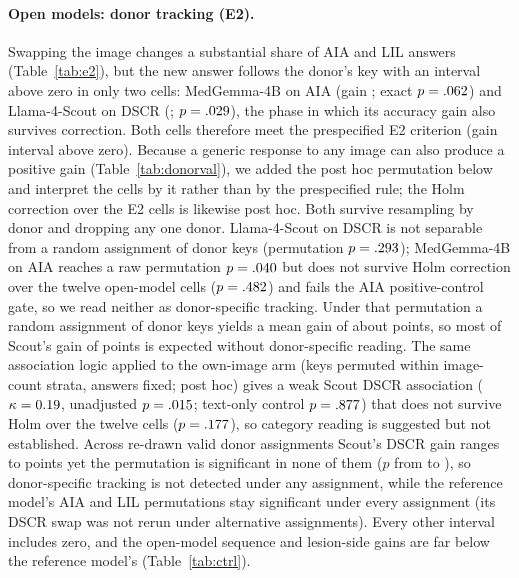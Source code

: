 \documentclass[conference]{IEEEtran}
\begin{document}
\paragraph{Open models: donor tracking (E2).} Swapping the image changes a substantial share of AIA and LIL answers (Table~\ref{tab:e2}), but the new answer follows the donor's key with an interval above zero in only two cells: MedGemma-4B on AIA (gain \vfourEtwoGainAIAMedGemma{}; exact $p=.062{}$) and Llama-4-Scout on DSCR (\vfourEtwoGainDSCRScout{}; $p=.029{}$), the phase in which its accuracy gain also survives correction. Both cells therefore meet the prespecified E2 criterion (gain interval above zero). Because a generic response to any image can also produce a positive gain (Table~\ref{tab:donorval}), we added the post hoc permutation below and interpret the cells by it rather than by the prespecified rule; the Holm correction over the E2 cells is likewise post hoc. Both survive resampling by donor and dropping any one donor. Llama-4-Scout on DSCR is not separable from a random assignment of donor keys (permutation $p=.293{}$); MedGemma-4B on AIA reaches a raw permutation $p=.040{}$ but does not survive Holm correction over the twelve open-model cells ($p=.482{}$) and fails the AIA positive-control gate, so we read neither as donor-specific tracking. Under that permutation a random assignment of donor keys yields a mean gain of about \vfourDonorNullMeanDSCRScout{} points, so most of Scout's gain of \vfourEtwoGainDSCRScout{} points is expected without donor-specific reading. The same association logic applied to the own-image arm (keys permuted within image-count strata, answers fixed; post hoc) gives a weak Scout DSCR association ($\kappa=0.19{}$, unadjusted $p=.015{}$; text-only control $p=.877{}$) that does not survive Holm over the twelve cells ($p=.177{}$), so category reading is suggested but not established. Across \vfourRobustScoutNAssign{} re-drawn valid donor assignments Scout's DSCR gain ranges \vfourRobustScoutDSCRGainMin{} to \vfourRobustScoutDSCRGainMax{} points yet the permutation is significant in none of them ($p$ from \vfourRobustScoutDSCRPermPMin{} to \vfourRobustScoutDSCRPermPMax{}), so donor-specific tracking is not detected under any assignment, while the reference model's AIA and LIL permutations stay significant under every assignment (its DSCR swap was not rerun under alternative assignments). Every other interval includes zero, and the open-model sequence and lesion-side gains are far below the reference model's (Table~\ref{tab:ctrl}).
\end{document}
